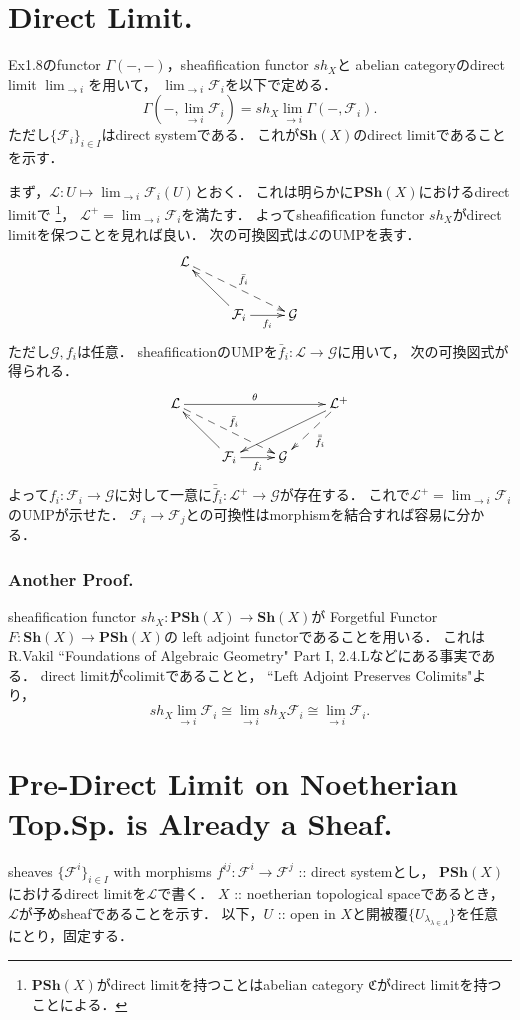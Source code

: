 \documentclass[a4paper]{jsarticle}
\newcommand{\shF}{\mathcal{F}}
\newcommand{\shG}{\mathcal{G}}
\newcommand{\shL}{\mathcal{L}}
\newcommand{\Sh}{\mathbf{Sh}}
\newcommand{\PSh}{\mathbf{PSh}}
\begin{document}
\section{Direct Limit.} %
    Ex1.8のfunctor $\Gamma(-,-)$，sheafification functor $sh_X$と
    abelian categoryのdirect limit $\lim_{\to i}$を用いて，
    $\lim_{\to i}\shF_i$を以下で定める．
    \[ \Gamma(-,\lim_{\to i}\shF_i)=sh_X \lim_{\to i} \Gamma(-,\shF_i). \]
    ただし$\{\shF_i\}_{i \in I}$はdirect systemである．
    これが$\Sh(X)$のdirect limitであることを示す．

    まず，$\shL: U \mapsto \lim_{\to i} \shF_i(U)$とおく．
    これは明らかに$\PSh(X)$におけるdirect limitで
    \footnote{$\PSh(X)$がdirect limitを持つことはabelian category $\mathfrak{C}$がdirect limitを持つことによる．}，
    $\shL^+=\lim_{\to i}\shF_i$を満たす．
    よってsheafification functor $sh_X$がdirect limitを保つことを見れば良い．
    次の可換図式は$\shL$のUMPを表す．
    \[
    \xymatrix
    {
        \shL \ar@{-->}[rrd]^-{\bar{f}_i}& {} & {} & {} \\
        {} & \shF_i \ar[r]_-{f_i} \ar[lu] & \shG & {}
    }
    \]
    ただし$\shG, f_i$は任意．
    sheafificationのUMPを$\bar{f}_i: \shL \to \shG$に用いて，
    次の可換図式が得られる．
    \[
    \xymatrix
    {
    \shL \ar@{-->}[rrd]^-{\bar{f}_i} \ar[rrr]^-{\theta}& {} & {} & \shL^+ \ar[lld] \ar@{-->}[ld]^-{\bar{\bar{f}}_i}\\
        {} & \shF_i \ar[r]_-{f_i} \ar[lu] & \shG & {}
    }
    \]
    よって$f_i:\shF_i \to \shG$に対して一意に$\bar{\bar{f}}_i: \shL^+ \to \shG$が存在する．
    これで$\shL^+=\lim_{\to i}\shF_i$のUMPが示せた．
    $\shF_i \to \shF_j$との可換性はmorphismを結合すれば容易に分かる．

    \subsubsection{Another Proof.} \label{sssec:1-10-1}
    sheafification functor $sh_X: \PSh(X) \to \Sh(X)$が
    Forgetful Functor $F: \Sh(X) \to \PSh(X)$の
    left adjoint functorであることを用いる．
    これはR.Vakil ``Foundations of Algebraic Geometry" Part I, 2.4.Lなどにある事実である．
    direct limitがcolimitであることと，
    ``Left Adjoint Preserves Colimits"より，
    \[ sh_X \lim_{\to i} \shF_i \cong \lim_{\to i} sh_X \shF_i \cong \lim_{\to i} \shF_i. \]

\section{Pre-Direct Limit on Noetherian Top.Sp. is Already a Sheaf.} %
sheaves $\{\shF^i\}_{i \in I}$ with morphisms $f^{ij}: \shF^i \to \shF^j$ :: direct systemとし，
    $\PSh(X)$におけるdirect limitを$\shL$で書く．
    $X$ :: noetherian topological spaceであるとき，$\shL$が予めsheafであることを示す．
    以下，$U$ :: open in $X$と開被覆$\{U_{\lambda}_{\lambda \in \Lambda}\}$を任意にとり，固定する．
\end{document}
